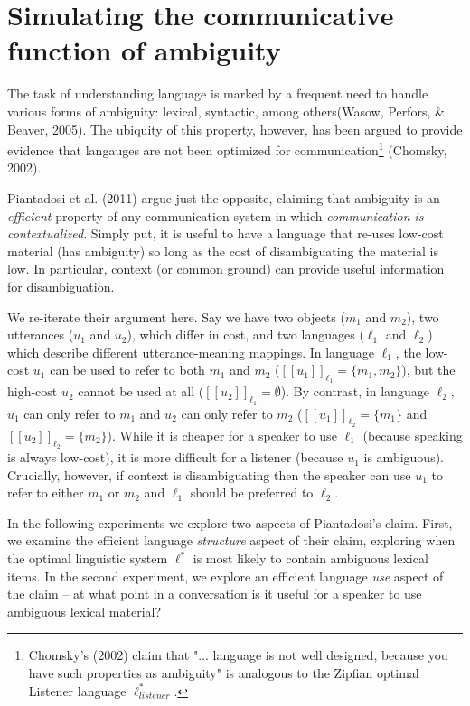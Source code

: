 \documentclass[10pt, letterpaper]{article}
\begin{document}
\section{Simulating the communicative function of
ambiguity}\label{simulating-the-communicative-function-of-ambiguity}

The task of understanding language is marked by a frequent need to
handle various forms of ambiguity: lexical, syntactic, among
others(Wasow, Perfors, \& Beaver, 2005). The ubiquity of this property,
however, has been argued to provide evidence that langauges are not been
optimized for
communication\footnote{Chomsky's (2002) claim that "... language is not well designed, because you have such properties as ambiguity" is analogous to the Zipfian optimal Listener language $\ell_{listener}^*$.}
(Chomsky, 2002).

Piantadosi et al. (2011) argue just the opposite, claiming that
ambiguity is an \emph{efficient} property of any communication system in
which \emph{communication is contextualized}. Simply put, it is useful
to have a language that re-uses low-cost material (has ambiguity) so
long as the cost of disambiguating the material is low. In particular,
context (or common ground) can provide useful information for
disambiguation.\par

We re-iterate their argument here. Say we have two objects (\(m_1\) and
\(m_2\)), two utterances (\(u_1\) and \(u_2\)), which differ in cost,
and two languages (\(\ell_1\) and \(\ell_2\)) which describe different
utterance-meaning mappings. In language \(\ell_1\), the low-cost \(u_1\)
can be used to refer to both \(m_1\) and \(m_2\)
(\([[u_1]]_{\ell_1} = \{m_1, m_2 \}\)), but the high-cost \(u_2\) cannot
be used at all (\([[u_2]]_{\ell_1} = \emptyset\)). By contrast, in
language \(\ell_2\), \(u_1\) can only refer to \(m_1\) and \(u_2\) can
only refer to \(m_2\) (\([[u_1]]_{\ell_2} = \{m_1\}\) and
\([[u_2]]_{\ell_2} = \{m_2 \}\)). While it is cheaper for a speaker to
use \(\ell_1\) (because speaking is always low-cost), it is more
difficult for a listener (because \(u_1\) is ambiguous). Crucially,
however, if context is disambiguating then the speaker can use \(u_1\)
to refer to either \(m_1\) or \(m_2\) and \(\ell_1\) should be preferred
to \(\ell_2\).\par

In the following experiments we explore two aspects of Piantadosi's
claim. First, we examine the efficient language \emph{structure} aspect
of their claim, exploring when the optimal linguistic system \(\ell^*\)
is most likely to contain ambiguous lexical items. In the second
experiment, we explore an efficient language \emph{use} aspect of the
claim -- at what point in a conversation is it useful for a speaker to
use ambiguous lexical material?\par
\end{document}
